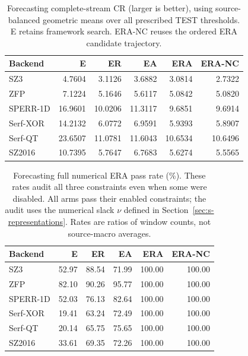 \begin{table}[t]
\centering
\small
\setlength{\tabcolsep}{5pt}
\caption{Forecasting complete-stream CR (larger is better), using source-balanced geometric means over all prescribed TEST thresholds. E retains framework search. ERA-NC reuses the ordered ERA candidate trajectory.}
\label{tab:s-ablation-cr-forecast}
\begin{tabular}{@{}lrrrrr@{}}
\toprule
Backend & E & ER & EA & ERA & ERA-NC \\
\midrule
SZ3 & 4.7604 & 3.1126 & 3.6882 & 3.0814 & 2.7322 \\
ZFP & 7.1224 & 5.1646 & 5.6117 & 5.0842 & 5.0820 \\
SPERR-1D & 16.9601 & 10.0206 & 11.3117 & 9.6851 & 9.6914 \\
Serf-XOR & 14.2132 & 6.0772 & 6.9591 & 5.9393 & 5.8907 \\
Serf-QT & 23.6507 & 11.0781 & 11.6043 & 10.6534 & 10.6496 \\
SZ2016 & 10.7395 & 5.7647 & 6.7683 & 5.6274 & 5.5565 \\
\bottomrule
\end{tabular}
\end{table}

\begin{table}[t]
\centering
\small
\setlength{\tabcolsep}{5pt}
\caption{Forecasting full numerical ERA pass rate (\%). These rates audit all three constraints even when some were disabled. All arms pass their enabled constraints; the audit uses the numerical slack $\nu$ defined in Section~\ref{sec:s-representations}. Rates are ratios of window counts, not source-macro averages.}
\label{tab:s-ablation-pass-forecast}
\begin{tabular}{@{}lrrrrr@{}}
\toprule
Backend & E & ER & EA & ERA & ERA-NC \\
\midrule
SZ3 & 52.97 & 88.54 & 71.99 & 100.00 & 100.00 \\
ZFP & 82.10 & 90.26 & 95.77 & 100.00 & 100.00 \\
SPERR-1D & 52.03 & 76.13 & 82.64 & 100.00 & 100.00 \\
Serf-XOR & 19.41 & 63.24 & 72.49 & 100.00 & 100.00 \\
Serf-QT & 20.14 & 65.75 & 75.65 & 100.00 & 100.00 \\
SZ2016 & 33.61 & 69.35 & 72.26 & 100.00 & 100.00 \\
\bottomrule
\end{tabular}
\end{table}

